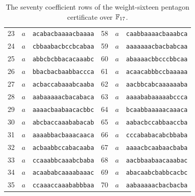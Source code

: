 \begin{table}[p]
\begin{tabular}{rllrll}
23&$a$&\texttt{acabacbaaaacbaaaa}&58&$a$&\texttt{caabbaaaacbaaabca}\\
24&$a$&\texttt{cbbaabacbccbcabaa}&59&$a$&\texttt{aaaaaaacbacbabcaa}\\
25&$a$&\texttt{abbcbcbbacacaaabc}&60&$a$&\texttt{abaaaacbbcccbbcaa}\\
26&$a$&\texttt{bbacbacbaabbaccca}&61&$a$&\texttt{acaacabbbccbaaaaa}\\
27&$a$&\texttt{acbaccabaaabcaaba}&62&$a$&\texttt{aacbbcabcaaaaaaba}\\
28&$a$&\texttt{aabaaaaacbacabaca}&63&$a$&\texttt{aaaababaaaaabccca}\\
29&$a$&\texttt{aaaacbaabaacacbbc}&64&$a$&\texttt{bcaabbaaaaacaaaca}\\
30&$a$&\texttt{abcbaccaaababacab}&65&$a$&\texttt{aabacbccabbaaccba}\\
31&$a$&\texttt{aaaabbacbaaacaaca}&66&$a$&\texttt{cccababacabcbbaba}\\
32&$a$&\texttt{acbaabbccabacaaba}&67&$a$&\texttt{aaaacbcaabaacbaba}\\
33&$a$&\texttt{ccaaabbcaaabcbaba}&68&$a$&\texttt{aacbbaabaacaaabac}\\
34&$a$&\texttt{acaababcaaaabaaac}&69&$a$&\texttt{abacaabcbabbcacbc}\\
35&$a$&\texttt{ccaaaccaaababbbaa}&70&$a$&\texttt{aabaaaaacbacbacba}\\
\bottomrule\end{tabular}
\caption{The seventy coefficient rows of the weight-sixteen pentagon certificate over $\mathbb F_{17}$.}\label{tab:rows17}
\end{table}
